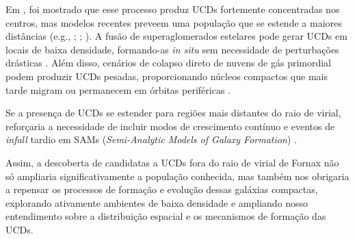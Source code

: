 Em \cite{Bekki_2001}, foi mostrado que esse processo produz UCDs fortemente concentradas nos centros, mas modelos recentes preveem uma população que se estende a maiores distâncias (e.g., \citealt{Br_ns_2011}; \citealt{Mieske_2011}; \citealt{Pfeffer_2016}). A fusão de superaglomerados estelares pode gerar UCDs em locais de baixa densidade, formando-as \textit{in situ} sem necessidade de perturbações drásticas \citep{Mieske_2011}. Além disso, cenários de colapso direto de nuvens de gás primordial podem produzir UCDs pesadas, proporcionando núcleos compactos que mais tarde migram ou permanecem em órbitas periféricas \citep{Drinkwater_2003}.

Se a presença de UCDs se estender para regiões mais distantes do raio de virial, reforçaria a necessidade de incluir modos de crescimento contínuo e eventos de \textit{infall} tardio em SAMs (\textit{Semi-Analytic Models of Galaxy Formation}) \citep{Pfeffer_2016}.

Assim, a descoberta de candidatas a UCDs fora do raio de virial de Fornax não só ampliaria significativamente a população conhecida, mas também nos obrigaria a repensar os processos de formação e evolução dessas galáxias compactas, explorando ativamente ambientes de baixa densidade e ampliando nosso entendimento sobre a distribuição espacial e os mecanismos de formação das UCDs.


